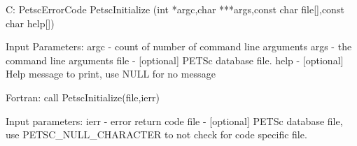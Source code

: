 C:
PetscErrorCode  PetscInitialize
   (int *argc,char ***args,const char file[],const char help[])

Input Parameters:
argc - count of number of command line arguments
args - the command line arguments
file - [optional] PETSc database file.
help - [optional] Help message to print, use NULL for no message

Fortran:
call PetscInitialize(file,ierr)

Input parameters:
ierr - error return code
file - [optional] PETSc database file,
    use PETSC_NULL_CHARACTER to not check for code specific file.
